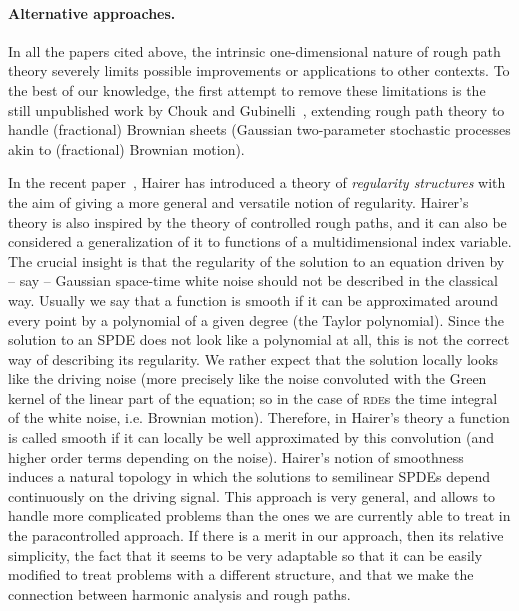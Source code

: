 \documentclass[a4paper,11pt]{article}
\theoremstyle{remark}
\begin{document}
\paragraph{Alternative approaches.}

In all the papers cited above, the intrinsic one-dimen\-sional nature of rough path theory severely limits possible improvements or applications to other contexts. To the best of our knowledge, the first attempt to remove these limitations is the still unpublished work by Chouk and Gubinelli~\cite{Chouk2013}, extending rough path theory to handle (fractional) Brownian sheets (Gaussian two-parameter stochastic processes akin to (fractional) Brownian motion).

In the recent paper~\cite{Hairer2013a}, Hairer has introduced a theory of \emph{regularity structures} with the aim of giving a more general and versatile notion of regularity. Hairer's theory is also inspired by the theory of controlled rough paths, and it can also be considered a generalization of it to functions of a multidimensional index variable. The crucial insight is that the regularity of the solution to an equation driven by -- say -- Gaussian space-time white noise should not be described in the classical way. Usually we say that a function is smooth if it can be approximated around every point by a polynomial of a given degree (the Taylor polynomial). Since the solution to an SPDE does not look like a polynomial at all, this is not the correct way of describing its regularity. We rather expect that the solution locally looks like the driving noise (more precisely like the noise convoluted with the Green kernel of the linear part of the equation; so in the case of \textsc{rde}s the time integral of the white noise, i.e. Brownian motion). Therefore, in Hairer's theory a function is called smooth if it can locally be well approximated by this convolution (and higher order terms depending on the noise). Hairer's notion of smoothness induces a natural topology in which the solutions to semilinear SPDEs depend continuously on the driving signal. This approach is very general, and allows to handle more complicated problems than the ones we are currently able to treat in the paracontrolled approach. If there is a merit in our approach, then its relative simplicity, the fact that it seems to be very adaptable so that it can be easily modified to treat problems with a different structure, and that we make the connection between harmonic analysis and rough paths.
\end{document}
